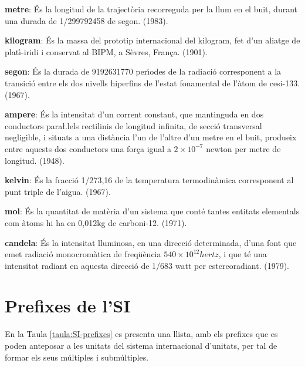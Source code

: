 \begin{list}{}
   {\setlength{\labelwidth}{22mm} \setlength{\leftmargin}{22mm} \setlength{\labelsep}{2mm}}
   \item[\textbf{metre}:] \'{E}s la longitud de la traject\`{o}ria recorreguda per la llum
   en el buit, durant una durada de 1/299792458 de segon. (1983).
   \item[\textbf{kilogram}:] \'{E}s la massa del prototip internacional del kilogram, fet d'un aliatge de plat\'{\i}-iridi i
    conservat al \textsf{BIPM}, a S\`{e}vres, Fran\c{c}a. (1901).
   \item[\textbf{segon}:] \'{E}s la durada de 9192631770 per\'{\i}odes de la
   radiaci\'{o} corresponent a la transici\'{o} entre els dos nivells
  hiperfins de l'estat fonamental de l'\`{a}tom de cesi-133. (1967).
   \item[\textbf{ampere}:] \'{E}s la intensitat d'un corrent constant,
   que mantinguda en dos conductors para{\l.l}els rectilinis de longitud
   infinita, de secci\'{o} transversal negligible, i situats a una
   dist\`{a}ncia l'un de l'altre d'un metre en el buit, produeix entre
   aquests dos conductors  una for\c{c}a igual a $2\times 10^{-7}$ newton per metre de longitud. (1948).
   \item[\textbf{kelvin}:] \'{E}s la fracci\'{o} 1/273,16 de la temperatura
   termodin\`{a}mica corresponent al punt triple de l'aigua. (1967).
   \item[\textbf{mol}:] \'{E}s la quantitat de mat\`{e}ria d'un sistema que cont\'{e} tantes
   entitats elementals com \`{a}toms hi ha en 0,012\unit{kg} de carboni-12. (1971).
   \item[\textbf{candela}:] \'{E}s la intensitat lluminosa, en una direcci\'{o} determinada,
   d'una font que emet radiaci\'{o} monocrom\`{a}tica de freq\"{u}\`{e}ncia $540\times 10^{12}\unit{hertz}$, i
   que t\'{e} una intensitat radiant en aquesta direcci\'{o} de 1/683 watt per estereoradiant. (1979).
\end{list}


\section{Prefixes de l'SI}

En la Taula \vref{taula:SI-prefixes} es presenta una llista, amb els
prefixes que es poden anteposar a les unitats del sistema
internacional d'unitats, per tal de formar els seus m\'{u}ltiples i
subm\'{u}ltiples.


